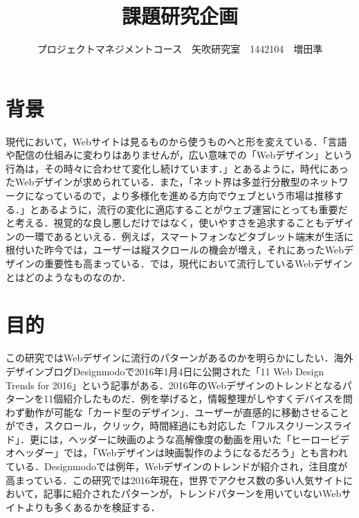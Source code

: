 \documentclass[uplatex,twocolumn,dvipdfmx]{jsarticle}
\title{\vspace{-5mm}\fontsize{14pt}{0pt}\selectfont 課題研究企画}
\author{\normalsize プロジェクトマネジメントコース　矢吹研究室　1442104　増田準}
\date{}
\begin{document}
\fontsize{10.5pt}{\baselineskip}\selectfont
\maketitle






\section{背景}
現代において，Webサイトは見るものから使うものへと形を変えている．「言語や配信の仕組みに変わりはありませんが，広い意味での「Webデザイン」という行為は，その時々に合わせて変化し続けています\cite{bib002}．」とあるように，時代にあったWebデザインが求められている．また，「ネット界は多並行分散型のネットワークになっているので，より多様化を進める方向でウェブという市場は推移する\cite{bib001}．」とあるように，流行の変化に適応することがウェブ運営にとっても重要だと考える．視覚的な良し悪しだけではなく，使いやすさを追求することもデザインの一環であるといえる．例えば，スマートフォンなどタブレット端末が生活に根付いた昨今では，ユーザーは縦スクロールの機会が増え，それにあったWebデザインの重要性も高まっている．では，現代において流行しているWebデザインとはどのようなものなのか．

\section{目的}
この研究ではWebデザインに流行のパターンがあるのかを明らかにしたい．海外デザインブログDesignmodoで2016年1月4日に公開された「11 Web Design Trends for 2016\cite{bib004}」という記事がある．2016年のWebデザインのトレンドとなるパターンを11個紹介したものだ．例を挙げると，情報整理がしやすくデバイスを問わず動作が可能な「カード型のデザイン」．ユーザーが直感的に移動させることができ，スクロール，クリック，時間経過にも対応した「フルスクリーンスライド」．更には，ヘッダーに映画のような高解像度の動画を用いた「ヒーロービデオヘッダー」では，「Webデザインは映画製作のようになるだろう」とも言われている．Designmodoでは例年，Webデザインのトレンドが紹介され，注目度が高まっている．この研究では2016年現在，世界でアクセス数の多い人気サイトにおいて，記事に紹介されたパターンが，トレンドパターンを用いていないWebサイトよりも多くあるかを検証する．
\end{document}
